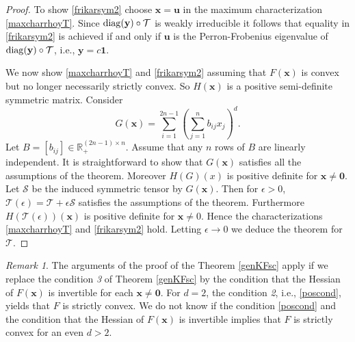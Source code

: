 \documentclass{amsart}
\newcommand{\diag}{\operatorname{diag}}
\newcommand{\R}{\mathbb{R}}
\newcommand{\uu}{\mathbf{u}}
\newcommand{\x}{\mathbf{x}}
\newcommand{\y}{\mathbf{y}}
\newcommand{\0}{\mathbf{0}}
\newcommand{\1}{\mathbf{1}}
\newcommand{\cS}{\mathcal{S}}
\newcommand{\cT}{\mathcal{T}}
\def\diag{\mathop{{\rm diag}}\nolimits}
\theoremstyle{remark}
\newtheorem{rem}{Remark}
\numberwithin{equation}{section} %
\begin{document}
\begin{proof}
 To show \eqref{frikarsym2}  choose $\x=\uu$ in the maximum characterization  \eqref{maxcharrhoyT}.  Since $\diag(\y)\circ\cT$ is weakly irreducible it follows that
 equality in \eqref{frikarsym2} is achieved if and only if $\uu$ is the Perron-Frobenius eigenvalue of $\diag(\y)\circ\cT$, i.e., $\y=c\1$.
  
 We now show  \eqref{maxcharrhoyT} and \eqref{frikarsym2} assuming that $F(\x)$ is convex but no longer necessarily strictly convex. 
%
So $H(\x)$ is a positive  semi-definite symmetric
 matrix.  Consider 
 \[G(\x)=\sum_{i=1}^{2n-1} (\sum_{j=1}^n b_{ij}x_j)^d.\] 
 Let $B=[b_{ij}]\in\R^{(2n-1)\times n}_{+}$.  Assume that any $n$ rows of $B$ are linearly independent.  It is straightforward to show that $G(\x)$ 
 satisfies all the assumptions of the theorem.  Moreover $H(G)(x)$ is positive definite for $\x\ne \0$.  Let $\cS$ be the induced symmetric tensor by $G(\x)$.
 Then for $\epsilon >0$, $\cT(\epsilon)=\cT+\epsilon \cS$ satisfies the assumptions of the theorem.  Furthermore $H(\cT(\epsilon))(\x)$ is positive definite
 for $\x\ne 0$.  Hence the characterizations   \eqref{maxcharrhoyT} and \eqref{frikarsym2} hold.  Letting $\epsilon \to 0$ we deduce the theorem for $\cT$.
  \end{proof} 
  
   \begin{rem} The arguments of the proof of the Theorem \ref{genKFsc} apply if we replace the condition \emph{3} of Theorem  \ref{genKFsc}
   by the condition that the Hessian of $F(\x)$ is invertible for each $\x\ne \0$.  For $d=2$, the condition \emph{2}, i.e., \eqref{poscond}, yields that $F$ is strictly convex.
   We do not know if the condition  \eqref{poscond} and the condition that  the Hessian of $F(\x)$ is invertible implies that $F$ is strictly convex for an even $d>2$.
\end{rem}
 
 
%
%
%
%
%
%
%
%
%
%
%
%
%
%
%
%
%
%
%
%
%
%
%

%
%
%
%
%
%
%
%
%
%
%
%
%
%
%
%
%
%
 
%
%
%
%
%
%
%
 
%
 
 
 
%
%
%
%
%
%
%
%
%
  
%
\end{document}
